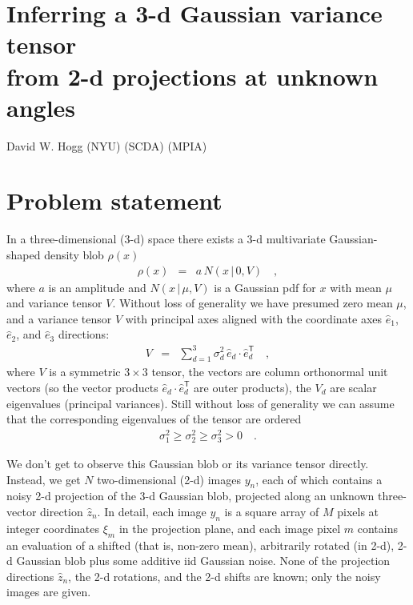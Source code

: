 \documentclass[12pt]{article}
\newcommand{\normal}{N}
\newcommand{\unitvec}[1]{\hat{#1}}
\newcommand{\ehat}{\unitvec{e}}
\newcommand{\zhat}{\unitvec{z}}
\newcommand{\transpose}{^{\mathsf{T}}}
\newcommand{\given}{\,|\,}
\begin{document}
\sloppy\sloppypar

\section*{Inferring a 3-d Gaussian variance tensor \\
          from 2-d projections at unknown angles}
\noindent
David W. Hogg (NYU) (SCDA) (MPIA)

\bigskip

\section{Problem statement}

In a three-dimensional (3-d) space there exists a 3-d multivariate
Gaussian-shaped density blob $\rho(x)$
\begin{eqnarray}
  \rho(x) &=& a\,\normal(x\given 0, V)
  \quad ,
\end{eqnarray}
where $a$ is an amplitude and $\normal(x\given\mu, V)$ is a Gaussian
pdf for $x$ with mean $\mu$ and variance tensor $V$.
Without loss of generality we have presumed zero mean $\mu$, and a
variance tensor $V$ with principal axes aligned with the coordinate
axes $\ehat_1$, $\ehat_2$, and $\ehat_3$ directions:
\begin{eqnarray}
  V &=& \sum_{d=1}^3 \sigma^2_d \, \ehat_d\cdot\ehat_d\transpose
  \quad ,
\end{eqnarray}
where $V$ is a symmetric $3\times3$ tensor, the vectors are column
orthonormal unit vectors (so the vector products
$\ehat_d\cdot\ehat_d\transpose$ are outer products), the $V_d$ are
scalar eigenvalues (principal variances).
Still without loss of generality we can assume that the corresponding
eigenvalues of the tensor are ordered
\begin{eqnarray}
  \sigma^2_1 \geq \sigma^2_2 \geq \sigma^2_3 > 0
  \quad .
\end{eqnarray}

We don't get to observe this Gaussian blob or its variance tensor
directly.
Instead, we get $N$ two-dimensional (2-d) images $y_n$, each of which
contains a noisy 2-d projection of the 3-d Gaussian blob,
projected along an unknown three-vector direction $\zhat_n$.
In detail, each image $y_n$ is a square array of $M$ pixels at integer
coordinates $\xi_m$ in the projection plane, and each image pixel $m$
contains an evaluation of a shifted (that is, non-zero mean),
arbitrarily rotated (in 2-d), 2-d Gaussian blob plus some additive iid
Gaussian noise.
None of the projection directions $\zhat_n$, the 2-d rotations, and
the 2-d shifts are known; only the noisy images are given.
\end{document}
